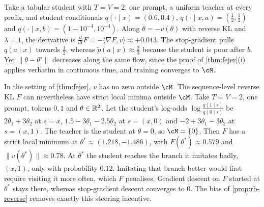 \begin{remark}\label{rem:not-lyapunov}
\Ck Take a tabular student with $T=V=2$, one prompt, a uniform teacher at every prefix, and student conditionals
$q(\cdot\mid x)=(0.6,0.4)$, $q(\cdot\mid x,a)=(\frac12,\frac12)$ and $q(\cdot\mid x,b)=(1-10^{-4},10^{-4})$. Along $\dot\theta=-v(\theta)$ with reverse KL and $\lambda=1$, the
derivative is $\frac{d}{dt}F=-\langle\nabla F,v\rangle\approx+0.013$. The stop-gradient pulls $q(a\mid x)$ towards $\frac12$, whereas
$\tilde p(a\mid x)\approx\frac23$ because the student is poor after $b$. Yet $\|\theta-\theta^\circ\|$ decreases along the same flow, since the
proof of \cref{thm:fejer}(i) applies verbatim in continuous time, and training converges to $\cM$.
\end{remark}

\begin{remark}\label{rem:spurious}
\Ck In the setting of \cref{thm:fejer}, $v$ has no zero outside $\cM$. The sequence-level reverse KL $F$ can nevertheless
have strict local minima outside $\cM$. Take $T=V=2$, one prompt, tokens $0,1$ and $\theta\in\mathbb{R}^2$. Let the student's log-odds
$\log\frac{q(1\mid s)}{q(0\mid s)}$ be $2\theta_1+3\theta_2$ at $s=x$, $1.5-3\theta_1-2.5\theta_2$ at $s=(x,0)$ and $-2+3\theta_1-3\theta_2$ at $s=(x,1)$. The teacher is the
student at $\theta=0$, so $\cM=\{0\}$. Then $F$ has a strict local minimum at $\theta^\ast\approx(1.218,-1.486)$, with $F(\theta^\ast)\approx0.579$ and
$\|v(\theta^\ast)\|\approx0.78$. At $\theta^\ast$ the student reaches the branch it imitates badly, $(x,1)$, only with probability $0.12$.
Imitating that branch better would first require visiting it more often, which $F$ penalises. Gradient descent
on $F$ started at $\theta^\ast$ stays there, whereas stop-gradient descent converges to $0$. The bias of \cref{prop:rb-reverse} removes
exactly this steering incentive.
\end{remark}

